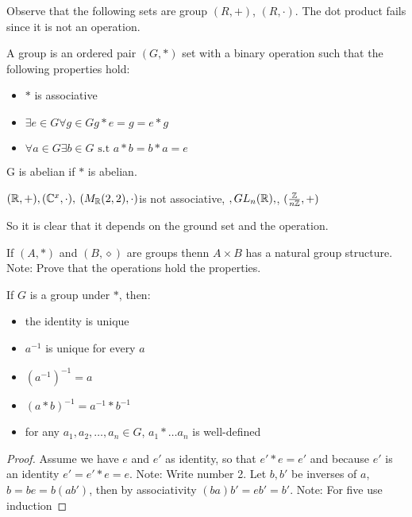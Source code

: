 \begin{example}
	Observe that the following sets are group $(R,+) $, $(R, \cdot) $. The dot product fails since it is not an operation.
\end{example}
\begin{define}
	A group is an ordered pair $(G,*)$ set with a binary operation such that the following properties hold:
	\begin{itemize}
		\item $*$ is associative
		\item $ \exists e \in G \forall g \in G g *e = g = e*g $
		\item $ \forall a \in G \exists b \in G \textrm{ s.t } a*b = b*a = e $
	\end{itemize}
	G is abelian if $*$ is abelian.
\end{define}
\begin{example}
	$ (\mathbb{R},+), (\mathbb{C}^x, \cdot), $ $(M_{\mathbb{R}}(2,2), \cdot)$is not associative, $, GL_{n}(\mathbb{R}), $, $(\frac{\mathbb{Z}}{n \mathbb{Z}}, +) $
\end{example}
So it is clear that it depends on the ground set and the operation.
\begin{example}
	If $ (A, *) $ and $ (B, \diamond) $ are groups thenn $ A \times B$ has a natural group structure. Note: Prove that the operations hold the properties.
\end{example}
\begin{thm}
	If $G$ is a group under $*$, then:
	\begin{itemize}
		\item the identity is unique
		\item $ a^{-1} $ is unique for every $a$
		\item $ (a^{-1})^{-1} = a $ \\
		\item $( a * b)^{-1} = a^{-1} * b^{-1} $ \\
		\item for any $a_1, a_2, \ldots , a_n  \in G$, $ a_1 * \ldots a_n$ is well-defined
	\end{itemize}
\end{thm}

\begin{proof}
	Assume we have $e$ and $ e'$ as identity, so that $ e' * e = e'$ and because $e'$ is an identity $e' = e' * e = e $.
	Note: Write number 2. Let $b, b'$ be inverses of $a$, $ b = be =b(ab') $, then by associativity $ (ba)b'= e b' = b' $.
	Note: For five use induction 
\end{proof}


